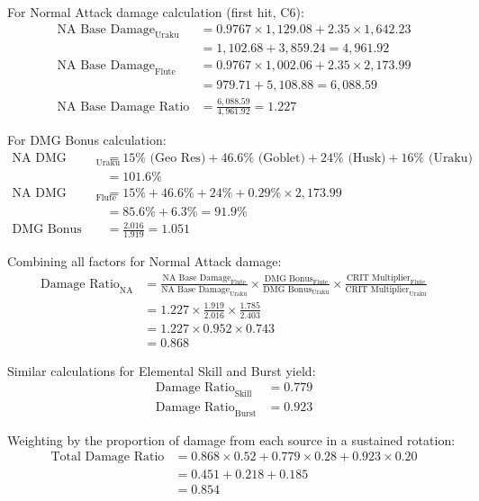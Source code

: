 \documentclass[12pt,a4paper]{article}
\begin{document}
For Normal Attack damage calculation (first hit, C6):
\begin{align}
\text{NA Base Damage}_{\text{Uraku}} &= 0.9767 \times 1,129.08 + 2.35 \times 1,642.23 \\
&= 1,102.68 + 3,859.24 = 4,961.92 \\
\text{NA Base Damage}_{\text{Flute}} &= 0.9767 \times 1,002.06 + 2.35 \times 2,173.99 \\
&= 979.71 + 5,108.88 = 6,088.59 \\
\text{NA Base Damage Ratio} &= \frac{6,088.59}{4,961.92} = 1.227
\end{align}

For DMG Bonus calculation:
\begin{align}
\text{NA DMG Bonus}_{\text{Uraku}} &= 15\% \text{ (Geo Res)} + 46.6\% \text{ (Goblet)} + 24\% \text{ (Husk)} + 16\% \text{ (Uraku)} \\
&= 101.6\% \\
\text{NA DMG Bonus}_{\text{Flute}} &= 15\% + 46.6\% + 24\% + 0.29\% \times 2,173.99 \\
&= 85.6\% + 6.3\% = 91.9\% \\
\text{DMG Bonus Ratio} &= \frac{2.016}{1.919} = 1.051
\end{align}

Combining all factors for Normal Attack damage:
\begin{align}
\text{Damage Ratio}_{\text{NA}} &= \frac{\text{NA Base Damage}_{\text{Flute}}}{\text{NA Base Damage}_{\text{Uraku}}} \times \frac{\text{DMG Bonus}_{\text{Flute}}}{\text{DMG Bonus}_{\text{Uraku}}} \times \frac{\text{CRIT Multiplier}_{\text{Flute}}}{\text{CRIT Multiplier}_{\text{Uraku}}} \\
&= 1.227 \times \frac{1.919}{2.016} \times \frac{1.785}{2.403} \\
&= 1.227 \times 0.952 \times 0.743 \\
&= 0.868
\end{align}

Similar calculations for Elemental Skill and Burst yield:
\begin{align}
\text{Damage Ratio}_{\text{Skill}} &= 0.779 \\
\text{Damage Ratio}_{\text{Burst}} &= 0.923
\end{align}

Weighting by the proportion of damage from each source in a sustained rotation:
\begin{align}
\text{Total Damage Ratio} &= 0.868 \times 0.52 + 0.779 \times 0.28 + 0.923 \times 0.20 \\
&= 0.451 + 0.218 + 0.185 \\
&= 0.854
\end{align}
\end{document}
